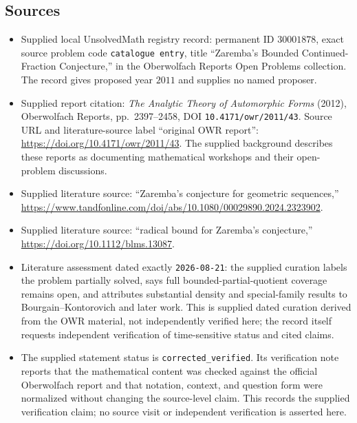 \documentclass[11pt]{article}
\begin{document}
\subsection{Sources}
\begin{itemize}
\item Supplied local UnsolvedMath registry record: permanent ID \(30001878\), exact source problem code \texttt{catalogue entry}, title ``Zaremba's Bounded Continued-Fraction Conjecture,'' in the Oberwolfach Reports Open Problems collection. The record gives proposed year \(2011\) and supplies no named proposer.
\item Supplied report citation: \emph{The Analytic Theory of Automorphic Forms} (2012), Oberwolfach Reports, pp.\ 2397--2458, DOI \texttt{10.4171/owr/2011/43}. Source URL and literature-source label ``original OWR report'': \url{https://doi.org/10.4171/owr/2011/43}. The supplied background describes these reports as documenting mathematical workshops and their open-problem discussions.
\item Supplied literature source: ``Zaremba's conjecture for geometric sequences,'' \url{https://www.tandfonline.com/doi/abs/10.1080/00029890.2024.2323902}.
\item Supplied literature source: ``radical bound for Zaremba's conjecture,'' \url{https://doi.org/10.1112/blms.13087}.
\item Literature assessment dated exactly \texttt{2026-08-21}: the supplied curation labels the problem partially solved, says full bounded-partial-quotient coverage remains open, and attributes substantial density and special-family results to Bourgain--Kontorovich and later work. This is supplied dated curation derived from the OWR material, not independently verified here; the record itself requests independent verification of time-sensitive status and cited claims.
\item The supplied statement status is \texttt{corrected\_verified}. Its verification note reports that the mathematical content was checked against the official Oberwolfach report and that notation, context, and question form were normalized without changing the source-level claim. This records the supplied verification claim; no source visit or independent verification is asserted here.
\end{itemize}
\end{document}
